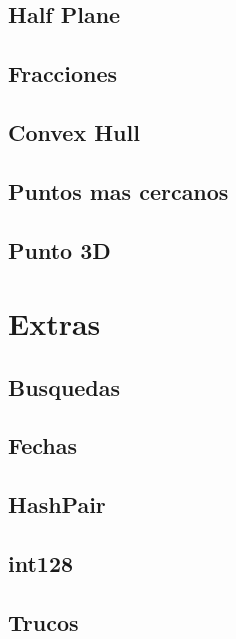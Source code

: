 \subsection{Half Plane}
\raggedbottom
\hrulefill
\subsection{Fracciones}
\raggedbottom
\hrulefill
\subsection{Convex Hull}
\raggedbottom
\hrulefill
\subsection{Puntos mas cercanos}
\raggedbottom
\hrulefill
\subsection{Punto 3D}
\raggedbottom
\hrulefill
\newpage

\section{Extras}
\subsection{Busquedas}
\raggedbottom
\hrulefill
\subsection{Fechas}
\raggedbottom
\hrulefill
\subsection{HashPair}
\raggedbottom
\hrulefill
\subsection{int128}
\raggedbottom
\hrulefill
\subsection{Trucos}
\raggedbottom
\hrulefill
\newpage

